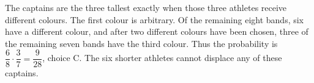 The captains are the three tallest exactly when those three athletes receive different colours. The first colour is arbitrary. Of the remaining eight bands, six have a different colour, and after two different colours have been chosen, three of the remaining seven bands have the third colour. Thus the probability is $\dfrac{6}{8}\cdot\dfrac{3}{7}=\boxed{\dfrac{9}{28}}$, choice C. The six shorter athletes cannot displace any of these captains.
